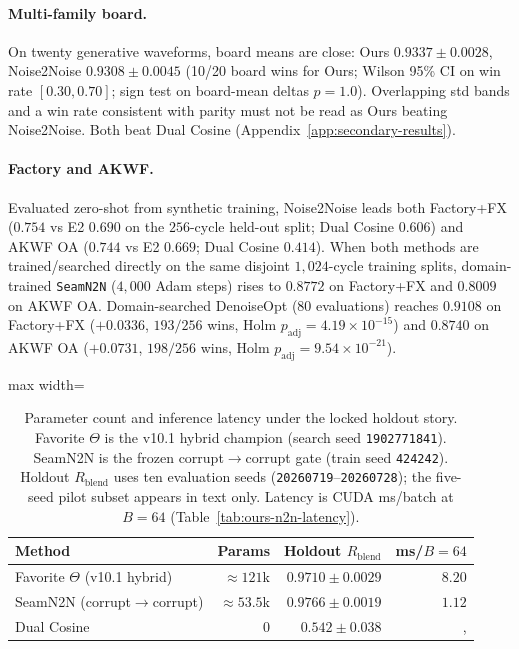 \paragraph{Multi-family board.}
On twenty generative waveforms, board means are close:
Ours $0.9337{\pm}0.0028$, Noise2Noise $0.9308{\pm}0.0045$
(10/20 board wins for Ours; Wilson 95\% CI on win rate $[0.30,0.70]$; sign test on board-mean deltas $p{=}1.0$).
Overlapping std bands and a win rate consistent with parity must not be read as Ours beating Noise2Noise.
Both beat Dual Cosine (Appendix~\ref{app:secondary-results}).

\paragraph{Factory and AKWF.}
Evaluated zero-shot from synthetic training, Noise2Noise leads both Factory+FX ($0.754$ vs E2 $0.690$ on the $256$-cycle held-out split; Dual Cosine $0.606$) and AKWF OA ($0.744$ vs E2 $0.669$; Dual Cosine $0.414$).
When both methods are trained/searched directly on the same disjoint $1{,}024$-cycle training splits, domain-trained \texttt{SeamN2N} ($4{,}000$ Adam steps) rises to $0.8772$ on Factory+FX and $0.8009$ on AKWF OA. Domain-searched DenoiseOpt ($80$ evaluations) reaches $\mathbf{0.9108}$ on Factory+FX ($+0.0336$, $193/256$ wins, Holm $p_{\mathrm{adj}}{=}4.19{\times}10^{-15}$) and $\mathbf{0.8740}$ on AKWF OA ($+0.0731$, $198/256$ wins, Holm $p_{\mathrm{adj}}{=}9.54{\times}10^{-21}$).

\begin{table}[htbp]
  \centering
  \caption{Parameter count and inference latency under the locked holdout story.
    Favorite $\Theta$ is the v10.1 hybrid champion (search seed \texttt{1902771841}).
    SeamN2N is the frozen corrupt$\to$corrupt gate (train seed \texttt{424242}).
    Holdout $R_{\mathrm{blend}}$ uses ten evaluation seeds (\texttt{20260719}--\texttt{20260728}); the five-seed pilot subset appears in text only.
    Latency is CUDA ms/batch at $B{=}64$ (Table~\ref{tab:ours-n2n-latency}).}
  \label{tab:param-fairness}
  \setlength{\tabcolsep}{4pt}
  \begin{adjustbox}{max width=\columnwidth}
\begin{tabular}{@{}lrrr@{}}
    \toprule
    Method & Params & Holdout $R_{\mathrm{blend}}$ & ms/$B{=}64$ \\
    \midrule
    Favorite $\Theta$ (v10.1 hybrid) & ${\approx}121$k & $0.9710{\pm}0.0029$ & $8.20$ \\
    SeamN2N (corrupt$\to$corrupt) & ${\approx}53.5$k & $0.9766{\pm}0.0019$ & $1.12$ \\
    Dual Cosine & $0$ & $0.542{\pm}0.038$ &, \\
    \bottomrule
  \end{tabular}
\end{adjustbox}
\end{table}

